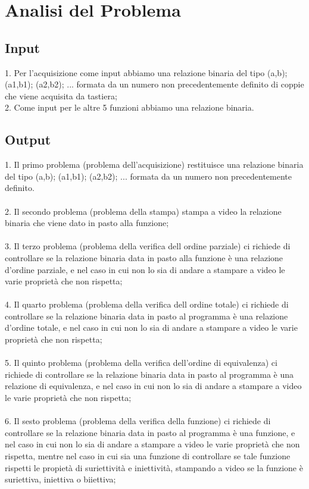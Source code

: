 \documentclass[11pt, a4paper, titlepage, block]{article}
\begin{document}
	\section{Analisi del Problema}
	\subsection{Input}
	
	
	1. Per l'acquisizione come input abbiamo una relazione binaria del tipo { (a,b); (a1,b1); (a2,b2); ...} formata da un numero non precedentemente definito di coppie che viene acquisita da tastiera;\\
	2. Come input per le altre 5 funzioni abbiamo una relazione binaria.\\
	\subsection{Output}
	
	
	1. Il primo problema (problema dell'acquisizione) restituisce una relazione binaria del tipo { (a,b); (a1,b1); (a2,b2); ...} formata da un numero non precedentemente definito.\\
	\\
	2. Il secondo problema (problema della stampa) stampa a video la relazione binaria che viene dato in pasto alla funzione;\\
	\\
	3. Il terzo problema (problema della verifica dell ordine parziale) ci richiede di controllare se la relazione binaria data in pasto alla funzione \`e una relazione d'ordine parziale, e nel caso in cui non lo sia di andare a stampare a video le varie propriet\`a che non rispetta;\\
	\\
	4. Il quarto problema (problema della verifica dell ordine totale) ci richiede di controllare se la relazione binaria data in pasto al programma \`e una relazione d'ordine totale, e nel caso in cui non lo sia di andare a stampare a video le varie propriet\`a che non rispetta;\\
	\\
	5. Il quinto problema (problema della verifica dell'ordine di equivalenza) ci richiede di controllare se la relazione binaria data in pasto al programma \`e una relazione di equivalenza, e nel caso in cui non lo sia di andare a stampare a video le varie propriet\`a che non rispetta;\\
	\\
	6. Il sesto problema (problema della verifica della funzione) ci richiede di controllare se la relazione binaria data in pasto al programma \`e una funzione, e nel caso in cui non lo sia di andare a stampare a video le varie propriet\`a che non rispetta, mentre nel caso in cui sia una funzione di controllare se tale funzione rispetti le propiet\`a di suriettivit\`a e iniettivit\`a, stampando a video se la funzione \`e suriettiva, iniettiva o biiettiva;\\
	
\end{document}

